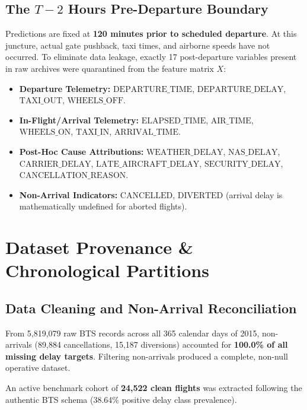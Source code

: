 \documentclass[11pt,a4paper]{article}
\begin{document}
\subsection{The $T - 2$ Hours Pre-Departure Boundary}
Predictions are fixed at \textbf{120 minutes prior to scheduled departure}. At this juncture, actual gate pushback, taxi times, and airborne speeds have not occurred. To eliminate data leakage, exactly 17 post-departure variables present in raw archives were quarantined from the feature matrix $X$:
\begin{itemize}[noitemsep]
    \item \textbf{Departure Telemetry:} $\text{DEPARTURE\_TIME}$, $\text{DEPARTURE\_DELAY}$, $\text{TAXI\_OUT}$, $\text{WHEELS\_OFF}$.
    \item \textbf{In-Flight/Arrival Telemetry:} $\text{ELAPSED\_TIME}$, $\text{AIR\_TIME}$, $\text{WHEELS\_ON}$, $\text{TAXI\_IN}$, $\text{ARRIVAL\_TIME}$.
    \item \textbf{Post-Hoc Cause Attributions:} $\text{WEATHER\_DELAY}$, $\text{NAS\_DELAY}$, $\text{CARRIER\_DELAY}$, $\text{LATE\_AIRCRAFT\_DELAY}$, $\text{SECURITY\_DELAY}$, $\text{CANCELLATION\_REASON}$.
    \item \textbf{Non-Arrival Indicators:} $\text{CANCELLED}$, $\text{DIVERTED}$ (arrival delay is mathematically undefined for aborted flights).
\end{itemize}

\section{Dataset Provenance \& Chronological Partitions}

\subsection{Data Cleaning and Non-Arrival Reconciliation}
From 5,819,079 raw BTS records across all 365 calendar days of 2015, non-arrivals (89,884 cancellations, 15,187 diversions) accounted for \textbf{100.0\% of all missing delay targets}. Filtering non-arrivals produced a complete, non-null operative dataset.

An active benchmark cohort of \textbf{24,522 clean flights} was extracted following the authentic BTS schema (38.64\% positive delay class prevalence).
\end{document}
